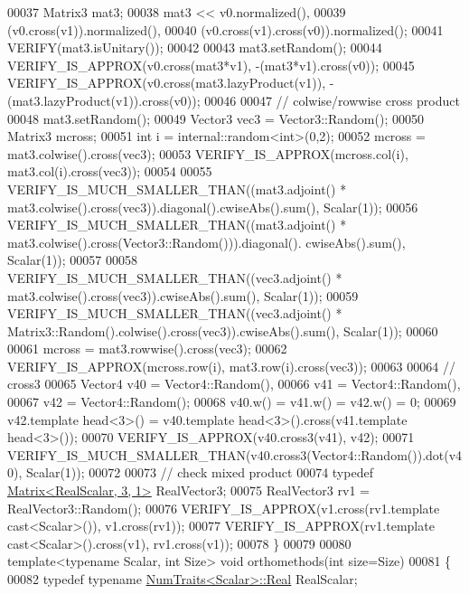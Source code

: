 \begin{DoxyCode}
00037   Matrix3 mat3;
00038   mat3 << v0.normalized(),
00039          (v0.cross(v1)).normalized(),
00040          (v0.cross(v1).cross(v0)).normalized();
00041   VERIFY(mat3.isUnitary());
00042   
00043   mat3.setRandom();
00044   VERIFY\_IS\_APPROX(v0.cross(mat3*v1), -(mat3*v1).cross(v0));
00045   VERIFY\_IS\_APPROX(v0.cross(mat3.lazyProduct(v1)), -(mat3.lazyProduct(v1)).cross(v0));
00046 
00047   \textcolor{comment}{// colwise/rowwise cross product}
00048   mat3.setRandom();
00049   Vector3 vec3 = Vector3::Random();
00050   Matrix3 mcross;
00051   \textcolor{keywordtype}{int} i = internal::random<int>(0,2);
00052   mcross = mat3.colwise().cross(vec3);
00053   VERIFY\_IS\_APPROX(mcross.col(i), mat3.col(i).cross(vec3));
00054   
00055   VERIFY\_IS\_MUCH\_SMALLER\_THAN((mat3.adjoint() * mat3.colwise().cross(vec3)).diagonal().cwiseAbs().sum(), 
      Scalar(1));
00056   VERIFY\_IS\_MUCH\_SMALLER\_THAN((mat3.adjoint() * mat3.colwise().cross(Vector3::Random())).diagonal().
      cwiseAbs().sum(), Scalar(1));
00057   
00058   VERIFY\_IS\_MUCH\_SMALLER\_THAN((vec3.adjoint() * mat3.colwise().cross(vec3)).cwiseAbs().sum(), Scalar(1));
00059   VERIFY\_IS\_MUCH\_SMALLER\_THAN((vec3.adjoint() * Matrix3::Random().colwise().cross(vec3)).cwiseAbs().sum(), 
      Scalar(1));
00060   
00061   mcross = mat3.rowwise().cross(vec3);
00062   VERIFY\_IS\_APPROX(mcross.row(i), mat3.row(i).cross(vec3));
00063 
00064   \textcolor{comment}{// cross3}
00065   Vector4 v40 = Vector4::Random(),
00066           v41 = Vector4::Random(),
00067           v42 = Vector4::Random();
00068   v40.w() = v41.w() = v42.w() = 0;
00069   v42.template head<3>() = v40.template head<3>().cross(v41.template head<3>());
00070   VERIFY\_IS\_APPROX(v40.cross3(v41), v42);
00071   VERIFY\_IS\_MUCH\_SMALLER\_THAN(v40.cross3(Vector4::Random()).dot(v40), Scalar(1));
00072   
00073   \textcolor{comment}{// check mixed product}
00074   \textcolor{keyword}{typedef} \hyperlink{group___core___module_class_eigen_1_1_matrix}{Matrix<RealScalar, 3, 1>} RealVector3;
00075   RealVector3 rv1 = RealVector3::Random();
00076   VERIFY\_IS\_APPROX(v1.cross(rv1.template cast<Scalar>()), v1.cross(rv1));
00077   VERIFY\_IS\_APPROX(rv1.template cast<Scalar>().cross(v1), rv1.cross(v1));
00078 \}
00079 
00080 \textcolor{keyword}{template}<\textcolor{keyword}{typename} Scalar, \textcolor{keywordtype}{int} Size> \textcolor{keywordtype}{void} orthomethods(\textcolor{keywordtype}{int} size=Size)
00081 \{
00082   \textcolor{keyword}{typedef} \textcolor{keyword}{typename} \hyperlink{group___core___module_struct_eigen_1_1_num_traits}{NumTraits<Scalar>::Real} RealScalar;

\end{DoxyCode}

